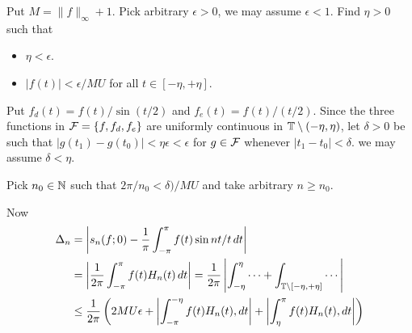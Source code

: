 \begin{enumerate}
Put \(M=\|f\|_\infty+1\).
Pick arbitrary \(\epsilon>0\), we may assume \(\epsilon < 1\).
Find \(\eta>0\)
such that 
\begin{itemize}
\item \(\eta < \epsilon\).
\item \(|f(t)| < \epsilon/MU\) for all \(t\in[-\eta,+\eta]\).
\end{itemize}

Put 
\(f_d(t) = f(t)/\sin(t/2)\)
and
\(f_e(t) = f(t)/(t/2)\).
Since the three functions in
\(\mathcal{F} = \{f, f_d, f_e\}\)
are uniformly continuous in \(\mathbb{T}\setminus(-\eta,\eta)\), 
let \(\delta > 0\) be such that \(|g(t_1) - g(t_0)| < \eta\epsilon < \epsilon\)
for \(g\in \mathcal{F}\)
whenever \(|t_1 - t_0| < \delta\). we may assume \(\delta<\eta\).

Pick \(n_0\in\mathbb{N}\) such that \(2\pi/n_0 < \delta)/MU\) and
take arbitrary \(n\geq n_0\).

Now
\begin{align}
\Delta_n 
&= \left|s_n(f;0) - \frac{1}{\pi}\int_{-\pi}^\pi f(t)\sin nt/t\,dt \right| 
   \notag \\
&= \left|\frac{1}{2\pi} \int_{-\pi}^\pi f(t)H_n(t)\,dt \right| 
 = 
   \frac{1}{2\pi}
   \left|
     \int_{-\eta}^\eta \cdots + \int_{\mathbb{T}\setminus[-\eta,+\eta]} \cdots
   \right| \notag \\
&\leq 
     \frac{1}{2\pi}
     \left(
         2MU\epsilon
       + \left|\int_{-\pi}^{-\eta} f(t)H_n(t),dt\right|
       + \left|\int_\eta^\pi f(t)H_n(t),dt\right|
     \right)  \label{eq:5.22:2int}
\end{align}


\end{enumerate}
